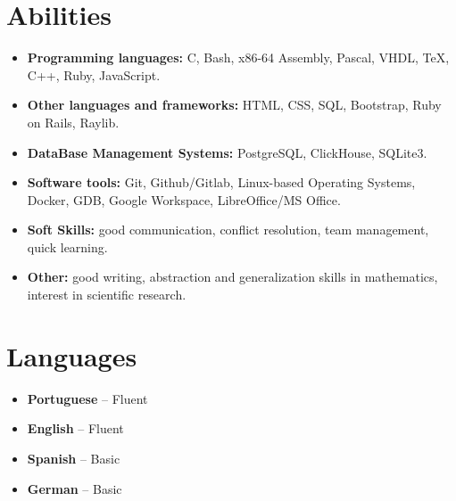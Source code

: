 \documentclass[a4paper, 12pt]{moderncv}
\begin{document}
\section{Abilities}
\vspace{4pt}
\begin{itemize}
    \item{\textbf{Programming languages:} C, Bash, x86-64 Assembly, Pascal, VHDL,
        \TeX, C++, Ruby, JavaScript.}
    \item{\textbf{Other languages and frameworks:} HTML, CSS, SQL, Bootstrap,
        Ruby on Rails, Raylib.}
    \vspace{4pt}
    \item{\textbf{DataBase Management Systems:} PostgreSQL, ClickHouse, SQLite3.}
    \vspace{4pt}
    \item{\textbf{Software tools:} Git, Github/Gitlab, Linux-based Operating
        Systems, Docker, GDB, Google Workspace, LibreOffice/MS Office.}
    \vspace{4pt}
    \item{\textbf{Soft Skills:} good communication, conflict resolution, team management,
        quick learning.}
    \vspace{4pt}
    \item{\textbf{Other:} good writing, abstraction and generalization skills in
        mathematics, interest in scientific research.}
\end{itemize}
\vspace{4pt}

\section{Languages}
\vspace{4pt}
\begin{itemize}
    \item{\textbf{Portuguese} -- Fluent}
    \item{\textbf{English} -- Fluent}
    \item{\textbf{Spanish} -- Basic}
    \item{\textbf{German} -- Basic}
\end{itemize}
\vspace{4pt}
\end{document}
